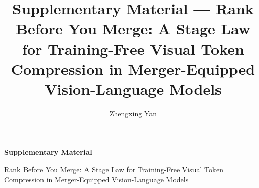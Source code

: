 %
%

\ifdefined\RBMIntegratedSupplement
  \appendix
  \begin{center}
    {\LARGE\bfseries Supplementary Material\par}
    \par\addvspace{4pt}
    {\large Rank Before You Merge: A Stage Law for Training-Free Visual Token
      Compression in Merger-Equipped Vision-Language Models\par}
  \end{center}
  \par\addvspace{6pt}
\else
  \documentclass[sigconf,nonacm]{acmart}

  \usepackage{booktabs}
  \usepackage{multirow}
  \usepackage{pifont}     %
  \usepackage{graphicx}
  \usepackage{url}        %


  \title[Rank Before You Merge: Supplementary Material]{Supplementary Material --- Rank Before You Merge: A Stage Law for
    Training-Free Visual Token Compression in Merger-Equipped Vision-Language
    Models}

  \author{Zhengxing Yan}

  

  \maketitle
\fi

\noindent\footnotesize Every number is indexed by an audit identifier in S9. Tables S1--S3/S7 support
\S\,5 of the body; S4--S6 support \S\,4; S8
supports \S\,3; S9 gives the per-cell artifact index, with cell, sample count,
official metric, token count, skip accounting, and manifest identifier in
S9.1--S9.3; S10 is a qualitative same-image pre/post selection comparison
rendered from measured Qwen3-VL-8B merger features (four panels each, no paired
question).

